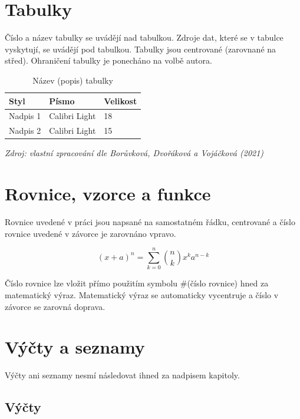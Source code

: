 \section{Tabulky}

{\color{infoBlue}
Číslo a název tabulky se uvádějí nad tabulkou. Zdroje dat, které se v tabulce vyskytují, se uvádějí pod tabulkou. Tabulky jsou centrované (zarovnané na střed). Ohraničení tabulky je ponecháno na volbě autora.
}

\begin{table}[h]
	\centering
		\caption{Název (popis) tabulky}
		\begin{tabular}{|l|l|l|}
			\hline
			Styl & Písmo & Velikost \\
			\hline
			Nadpis 1 & Calibri Light & 18 \\
			Nadpis 2 & Calibri Light & 15 \\
			\hline
		\end{tabular}
        
		\small\textit{Zdroj: vlastní zpracování dle Borůvková, Dvořáková a Vojáčková (2021)}
\end{table}

\section{Rovnice, vzorce a funkce}

{\color{infoBlue}
Rovnice uvedené v práci jsou napsané na samostatném řádku, centrované a číslo rovnice uvedené v závorce je zarovnáno vpravo. 
}

\begin{equation}
(x +a)^n = \sum_{k=0}^{n} \binom{n}{k} x^k a^{n-k}
\end{equation}

{\color{infoBlue}
Číslo rovnice lze vložit přímo použitím symbolu \#(číslo rovnice) hned za matematický výraz. Matematický výraz se automaticky vycentruje a číslo v závorce se zarovná doprava.
}

\section{Výčty a seznamy}

{\color{infoBlue}
Výčty ani seznamy nesmí následovat ihned za nadpisem kapitoly.
}

\subsection{Výčty}

